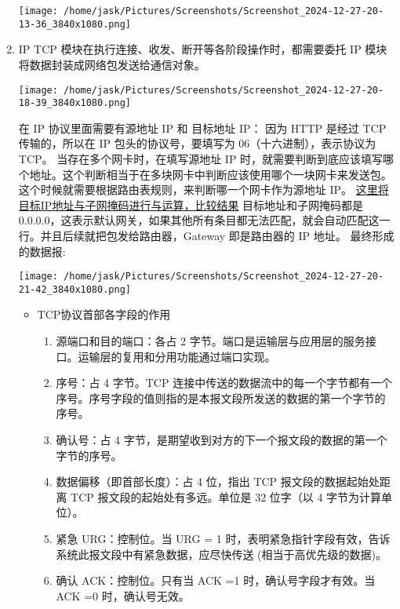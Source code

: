 \documentclass[11pt]{article}
\begin{document}
\begin{enumerate}
\begin{center}
\texttt{[image: /home/jask/Pictures/Screenshots/Screenshot\_2024-12-27-20-13-36\_3840x1080.png]}
\end{center}
\item IP
TCP 模块在执行连接、收发、断开等各阶段操作时，都需要委托 IP 模块将数据封装成网络包发送给通信对象。
\begin{center}
\texttt{[image: /home/jask/Pictures/Screenshots/Screenshot\_2024-12-27-20-18-39\_3840x1080.png]}
\end{center}
在 IP 协议里面需要有源地址 IP 和 目标地址 IP：
因为 HTTP 是经过 TCP 传输的，所以在 IP 包头的协议号，要填写为 06（十六进制），表示协议为 TCP。
当存在多个网卡时，在填写源地址 IP 时，就需要判断到底应该填写哪个地址。这个判断相当于在多块网卡中判断应该使用哪个一块网卡来发送包。
这个时候就需要根据路由表规则，来判断哪一个网卡作为源地址 IP。
\uline{这里将目标IP地址与子网掩码进行与运算，比较结果}
目标地址和子网掩码都是 0.0.0.0，这表示默认网关，如果其他所有条目都无法匹配，就会自动匹配这一行。并且后续就把包发给路由器，Gateway 即是路由器的 IP 地址。
最终形成的数据报:
\begin{center}
\texttt{[image: /home/jask/Pictures/Screenshots/Screenshot\_2024-12-27-20-21-42\_3840x1080.png]}
\end{center}
\begin{itemize}
\item TCP协议首部各字段的作用
\begin{enumerate}
\item 源端口和目的端口：各占 2 字节。端口是运输层与应用层的服务接口。运输层的复用和分用功能通过端口实现。

\item 序号：占 4 字节。TCP 连接中传送的数据流中的每一个字节都有一个序号。序号字段的值则指的是本报文段所发送的数据的第一个字节的序号。

\item 确认号：占 4 字节，是期望收到对方的下一个报文段的数据的第一个字节的序号。

\item 数据偏移（即首部长度）：占 4 位，指出 TCP 报文段的数据起始处距离 TCP 报文段的起始处有多远。单位是 32 位字（以 4 字节为计算单位）。

\item 紧急 URG：控制位。当 URG = 1 时，表明紧急指针字段有效，告诉系统此报文段中有紧急数据，应尽快传送 (相当于高优先级的数据)。

\item 确认 ACK：控制位。只有当 ACK =1 时，确认号字段才有效。当 ACK =0 时，确认号无效。


\end{enumerate}
\end{itemize}
\end{enumerate}
\end{document}
